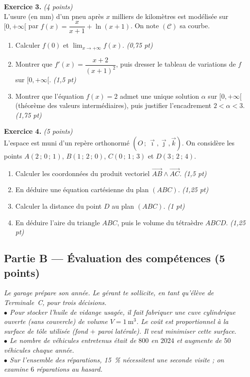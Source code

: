 \smallskip
\noindent\textbf{Exercice 3.} \hfill\textit{(4 points)}\\
L'usure (en mm) d'un pneu après $x$ milliers de kilomètres est modélisée sur $[0,+\infty[$ par
$f(x)=\dfrac{x}{x+1}+\ln(x+1)$. On note $(\mathcal{C})$ sa courbe.
\begin{enumerate}[label=\arabic*)]
\item Calculer $f(0)$ et $\displaystyle\lim_{x\to+\infty}f(x)$. \hfill\textit{(0,75 pt)}
\item Montrer que $f'(x)=\dfrac{x+2}{(x+1)^2}$, puis dresser le tableau de variations de $f$ sur $[0,+\infty[$. \hfill\textit{(1,5 pt)}
\item Montrer que l'équation $f(x)=2$ admet une unique solution $\alpha$ sur $[0,+\infty[$
(théorème des valeurs intermédiaires), puis justifier l'encadrement $2<\alpha<3$. \hfill\textit{(1,75 pt)}
\end{enumerate}

\smallskip
\noindent\textbf{Exercice 4.} \hfill\textit{(5 points)}\\
L'espace est muni d'un repère orthonormé $(O\,;\,\vec\imath,\vec\jmath,\vec k)$. On considère les
points $A(2\,;\,0\,;\,1)$, $B(1\,;\,2\,;\,0)$, $C(0\,;\,1\,;\,3)$ et $D(3\,;\,2\,;\,4)$.
\begin{enumerate}[label=\arabic*)]
\item Calculer les coordonnées du produit vectoriel $\vec{AB}\wedge\vec{AC}$. \hfill\textit{(1,5 pt)}
\item En déduire une équation cartésienne du plan $(ABC)$. \hfill\textit{(1,25 pt)}
\item Calculer la distance du point $D$ au plan $(ABC)$. \hfill\textit{(1 pt)}
\item En déduire l'aire du triangle $ABC$, puis le volume du tétraèdre $ABCD$. \hfill\textit{(1,25 pt)}
\end{enumerate}

\subsection*{Partie B — Évaluation des compétences \hfill (5 points)}

\noindent\textit{Le garage prépare son année. Le gérant te sollicite, en tant qu'élève de
Terminale~C, pour trois décisions.\\
$\bullet$ Pour stocker l'huile de vidange usagée, il fait fabriquer une cuve cylindrique \emph{ouverte}
(sans couvercle) de volume $V=\SI{1}{\cubic\metre}$. Le coût est proportionnel à la surface de
tôle utilisée (fond $+$ paroi latérale). Il veut minimiser cette surface.\\
$\bullet$ Le nombre de véhicules entretenus était de $800$ en $2024$ et augmente de $50$ véhicules chaque année.\\
$\bullet$ Sur l'ensemble des réparations, \SI{15}{\percent} nécessitent une seconde visite ; on examine $6$ réparations au hasard.}

